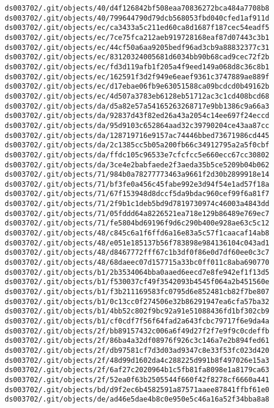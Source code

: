 \documentclass[11pt]{article}
\begin{document}
\begin{Verbatim}[commandchars=\\\{\}]
ds003702/.git/objects/40/d4f126842bf508eaa70836272bca484a7708b8
ds003702/.git/objects/40/799644790d79dcb568053fbd040cfed1af911d
ds003702/.git/objects/ec/ca3433a5c211ed60ca8d1687f187cec54eadf5
ds003702/.git/objects/ec/7ce75fca212aeb919728168eaf87d07443c3b1
ds003702/.git/objects/ec/44cf50a6aa9205bedf96ad3cb9a88832377c31
ds003702/.git/objects/ec/83120324005681d6034bb90b68cad9cec72f2b
ds003702/.git/objects/ec/fd3d119afb1f205a4f9eed149a068d8c36c8b1
ds003702/.git/objects/ec/162591f3d2f949e6eaef9361c3747889ae889f
ds003702/.git/objects/ec/d17ebae06fb9e63051588ca09bcdcd0b49162b
ds003702/.git/objects/ec/4d507a3783eb6128eb51712ac3c1cd408bcd68
ds003702/.git/objects/da/d5a82e57a54165263268717e9bb1386c9a66a3
ds003702/.git/objects/da/92837d43f82ed26a43a2054c14ee697f24eccd
ds003702/.git/objects/da/95d9103c652864aad32c39790204ce43aa87cc
ds003702/.git/objects/da/128719716e9157ac74446bbed73671986cd445
ds003702/.git/objects/da/2c1385cc5b05a200fb66c34912795a2a5f0cbf
ds003702/.git/objects/da/ffdc105c96533e7cfcfcc5e660ecc67cc30802
ds003702/.git/objects/da/3ce4e2babfaede2f3aeda35b5ce5209b04b062
ds003702/.git/objects/71/984b0a78277773463a9661f2d30b2899918e14
ds003702/.git/objects/71/bf3fe0a456c45fabe992e3d94f54e1ad57f18a
ds003702/.git/objects/71/67f153948d8dccf5da9bdac960cef99f6a81f7
ds003702/.git/objects/71/2f9b1c1deb5bd9d7819730974c46003a4843dd
ds003702/.git/objects/71/05fddd64a8226521ea718e129b86489e769ec7
ds003702/.git/objects/71/fe5804bd69196f9d6c290b400e928ae63c5c12
ds003702/.git/objects/48/c845c6a1f6ffd6a16e83a5c57f1caacaf14ab8
ds003702/.git/objects/48/e051e185137b56f783898e984136104c043ad1
ds003702/.git/objects/48/d8467772fff67c1b3df0f86e0d7df60ee0c3c7
ds003702/.git/objects/48/68daeec07d157715a33bc0ff011c8aba690770
ds003702/.git/objects/b1/2b3534064bba0aaed6eecd7e8fe942ef1f13d5
ds003702/.git/objects/b1/f530037cf49f3542093b4545f064a2b451560e
ds003702/.git/objects/b1/f3b211169583fc0795d6e852481cb82f7be807
ds003702/.git/objects/b1/0c13cc0f274506e32b86291947ea6cfa57ba32
ds003702/.git/objects/b1/4bb52c802f9bc92a91e51088436fd1bf302cb9
ds003702/.git/objects/b1/cf0cdf7f56f64fad2a643fcbc79717f6e9da4a
ds003702/.git/objects/2f/bb89157432c006a6f49d27f2f7e9f9c0cdeffb
ds003702/.git/objects/2f/86ba4a32df08976f926c3c146a7e2b894fed61
ds003702/.git/objects/2f/db97581cf7d3d03ad9347c8e33f53fc023d420
ds003702/.git/objects/2f/48d99d1602da4c288225d991b8f497026e15a3
ds003702/.git/objects/2f/6af27c2020964b1c5fb81fa8098e1a8179ca63
ds003702/.git/objects/2f/52ea0f63b2505544f660f42f8278cf6660a441
ds003702/.git/objects/bd/d9f2ec6b4582591a87571aaee87841ffbf61e0
ds003702/.git/objects/de/ad46e5dae4b8c0e950e5c46a16a52f34bba8a8

\end{Verbatim}
\end{document}

